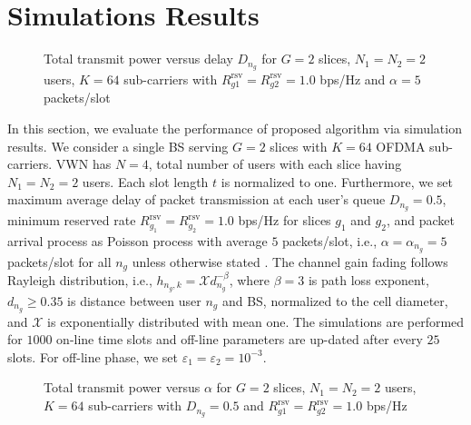 \documentclass[journal,draftclsnofoot,12pt,onecolumn]{IEEEtran}
\begin{document}
\section{Simulations Results}


\begin{figure}[hbt]
    \centering
    \caption{Total transmit power versus delay ${D}_{n_g}$ for $G=2$ slices, $N_1=N_2=2$ users, $K=64$ sub-carriers with $R_{g1}^\text{rsv} = R_{g2}^\text{rsv} = 1.0$ bps/Hz and $\alpha = 5$ packets/slot}
    \label{PowerVsDelay}
\end{figure}



In this section, we evaluate the performance of proposed algorithm
via simulation results. We consider a single BS serving $G=2$ slices
with $K=64$ OFDMA sub-carriers. VWN has $N=4$, total number of users
with each slice having $N_1 = N_2 = 2$ users. {Each
slot length $t$ is normalized to one.} Furthermore, we set maximum
average delay of packet transmission at each user's queue
{${D}_{n_g} = 0.5$,}
minimum reserved rate $R_{g_1}^\text{rsv} = R_{g_2}^\text{rsv} =
1.0$ bps/Hz for slices $g_1$ and $g_2$, and packet arrival process
as Poisson process with average $5$ packets/slot, i.e.,
$\alpha=\alpha_{n_g}=5$ packets/slot for all $n_g$  unless otherwise
stated {\cite{6157070}}.  The channel gain fading follows Rayleigh
distribution, i.e., $h_{n_g,k} = \mathcal{X}d_{n_g}^{-\beta}$, where
$\beta = 3$ is path loss exponent, {$d_{n_g} \geq 0.35$ is distance between user $n_g$ and BS,} normalized to the cell diameter, and $\mathcal{X}$ is exponentially distributed with mean
one. The simulations are performed for $1000$
on-line time slots and off-line parameters are up-dated after every
$25$ slots. For off-line phase, we set $\varepsilon_1 =
\varepsilon_2 = 10^{-3}$.

\begin{figure}[hbt]
    \centering
    \caption{Total transmit power versus $\alpha$ for $G=2$ slices, $N_1=N_2=2$ users, $K=64$ sub-carriers with {$D_{n_g} = 0.5 $} and $R_{g1}^\text{rsv} = R_{g2}^\text{rsv} = 1.0$ bps/Hz}
    \label{PowerVsAlpha}
\end{figure}
\end{document}
